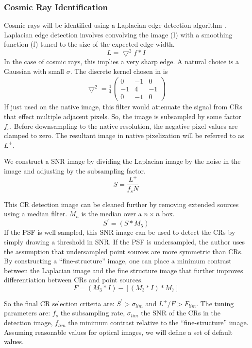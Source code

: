 \subsubsection{Cosmic Ray Identification}
\label{sec:acCosmicRayDetection}
Cosmic rays will be identified using a Laplacian edge detection algorithm \citep{2001PASP..113.1420V}.  Laplacian edge detection involves convolving the image (I) with a smoothing function (f) tuned to the size of the expected edge width.
\[
L = \bigtriangledown^2f\ast I
\]
In the case of cosmic rays, this implies a very sharp edge.  A natural choice is a Gaussian with small $\sigma$.  The discrete kernel chosen in \citep{2001PASP..113.1420V} is
\begin{align}
\bigtriangledown^2 = \frac{1}{4}\left( \begin{array}{ccc}
0 & -1 & 0 \\
-1 & 4 & -1 \\
0 & -1 & 0 \end{array} \right)
\end{align}
If just used on the native image, this filter would attenuate the signal from CRs that effect multiple
adjacent pixels.  So, the image is subsampled by some factor $f_s$.  Before downsampling to the native resolution, the negative pixel values are clamped to zero.  The resultant image in native pixelization will be referred to as $L^+$.

We construct a SNR image by dividing the Laplacian image by the noise in the image and adjusting by the subsampling factor.
\[
S = \frac{L^+}{f_s N}
\]

This CR detection image can be cleaned further by removing extended sources using a median filter. $M_n$ is the median over a $n \times n$ box.
\[
S^\prime = (S \ast M_5)
\]
If the PSF is well sampled, this SNR image can be used to detect the CRs by simply drawing a threshold in SNR.
If the PSF is undersampled, the author uses the assumption that undersampled point sources are more symmetric
than CRs.  By constructing a ``fine-structure'' image, one can place a minimum contrast between the Laplacian image and the fine structure image that further improves differentiation between CRs and point sources.
\[
F = (M_3 \ast I) - [(M_3 \ast I) \ast M_7]
\]

So the final CR selection criteria are: $S^\prime > \sigma_{lim}$ and $L^+/F > F_{lim}$.  The tuning
parameters are: $f_s$ the subsampling rate, $\sigma_{lim}$ the SNR of the CRs in the detection image,
$f_{lim}$ the minimum contrast relative to the ``fine-structure'' image. Assuming reasonable values for optical
images, we will define a set of default values.

